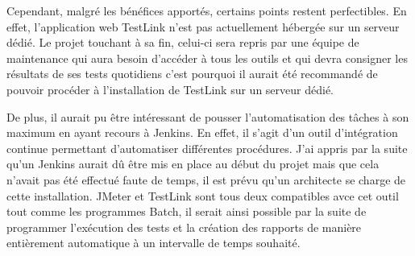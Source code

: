 	Cependant, malgré les bénéfices apportés, certains points restent perfectibles. En effet, l'application web TestLink n'est pas actuellement hébergée sur un serveur dédié. Le projet touchant à sa fin, celui-ci sera repris par une équipe de maintenance qui aura besoin d'accéder à tous les outils et qui devra consigner les résultats de ses tests quotidiens c'est pourquoi il aurait été recommandé de pouvoir procéder à l'installation de TestLink sur un serveur dédié. 
	
	De plus, il aurait pu être intéressant de pousser l'automatisation des tâches à son maximum en ayant recours à Jenkins. En effet, il s'agit d'un outil d'intégration continue permettant d'automatiser différentes procédures. J'ai appris par la suite qu'un Jenkins aurait dû être mis en place au début du projet mais que cela n'avait pas été effectué faute de temps, il est prévu qu'un architecte se charge de cette installation. JMeter et TestLink sont tous deux compatibles avce cet outil tout comme les programmes Batch, il serait ainsi possible par la suite de programmer l'exécution des tests et la création des rapports de manière entièrement automatique à un intervalle de temps souhaité.